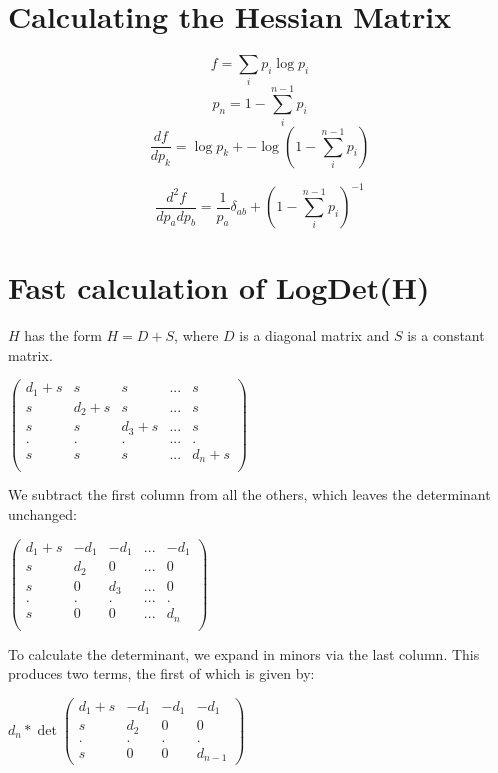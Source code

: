\documentclass[12pt]{article}
\begin{document}
\section{Calculating the Hessian Matrix}

$$f = \sum_i p_i \log p_i$$
$$p_n = 1 - \sum_i^{n-1} p_i$$
$$\frac{df}{dp_k} =  \log p_k + -\log (1 - \sum_i^{n-1} p_i)$$

$$\frac{d^2f}{dp_a dp_b} = \frac{1}{p_a} \delta_{ab} + (1 - \sum_i^{n-1} p_i)^{-1}$$

\section{Fast calculation of LogDet(H)}

$H$ has the form $H = D + S$, where $D$ is a diagonal matrix and $S$ is a constant matrix.  

\begin{math}
\begin{pmatrix}
 d_1 + s & s       & s       & ... & s   \\
 s       & d_2 + s & s       & ... & s   \\
 s       & s       & d_3 + s & ... & s   \\
 .       & .       & .       & ... & .   \\
 s       & s       & s       & ... & d_n + s \\
\end{pmatrix}
\end{math}

We subtract the first column from all the others, which leaves the determinant unchanged:

\begin{math}
\begin{pmatrix}
 d_1 + s & -d_1  & -d_1 & ... & -d_1   \\
 s   & d_2   & 0    & ... & 0   \\
 s   & 0     & d_3  & ... & 0   \\
 .   & .     & .    & ... & .   \\
 s   & 0     & 0    & ... & d_n \\
\end{pmatrix}
\end{math}

To calculate the determinant, we expand in minors via the last column.  This produces two terms, the first of which is given by:

\begin{math}
d_n * \det
\begin{pmatrix}
 d_1 + s & -d_1  & -d_1 & -d_1 \\
 s   & d_2   & 0        & 0    \\
 .   & .     & .        & . \\
 s   & 0     & 0        & d_{n-1} 
\end{pmatrix}
\end{math}
\end{document}
